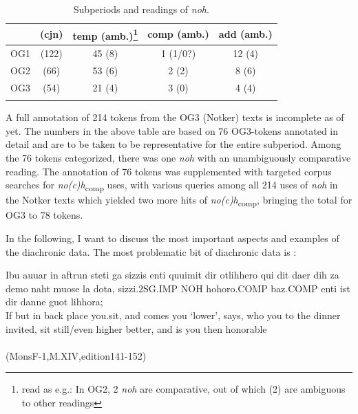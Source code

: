 \documentclass[output=paper,
modfonts
]{langscibook}
\begin{document}
\begin{table}[p]
\begin{tabular}{lcccc}
\lsptoprule
	& (cjn) & temp (amb.)\footnote{read as e.g.: In OG2, 2 \textit{noh} are comparative, out of which (2) are ambiguous to other readings}& comp (amb.)	& add (amb.)	\\
\midrule
OG1		& (122) & 45 (8)    & 1 (1/0?)  & 12 (4)    \\ 
OG2		& (66)  & 53 (6)    & 2 (2)     & 8 (6)     \\
OG3		& (54)  & 21 (4)    & 3 (0)     & 4 (4)     \\
\lspbottomrule
\end{tabular}
\caption{Subperiods and readings of \textit{noh}.}
\label{tab:subperiods_and_readings}
\end{table}

\noindent A full annotation of 214 tokens from the OG3 (Notker) texts is incomplete as of yet. The numbers in the above table are based on 76 OG3-tokens annotated in detail and are to be taken to be representative for the entire subperiod. Among the 76 tokens categorized, there was one \textit{noh} with an unambiguously comparative reading. The annotation of 76 tokens was supplemented with targeted corpus searches for \textit{no(c)h}\textsubscript{comp} uses, with various queries among all 214 uses of \textit{noh} in the Notker texts which yielded two more hits of \textit{no(c)h}\textsubscript{comp}, bringing the total for OG3 to 78 tokens.

In the following, I want to discuss the most important aspects and examples of the diachronic data. The most problematic bit of diachronic data is :

\ea\gll Ibu auuar in aftrun steti {ga sizzis} enti quuimit dir otlihhero {qui dit} daer dih za demo {naht muose} {la dota,} sizzi.2SG.IMP NOH hohoro.COMP baz.COMP enti ist dir danne {guot lihhora;}\\
       If but in back place you.sit, and comes you `lower', says, who you to the dinner invited, sit still/even higher better, and is you then honorable\\
 \label{OG1_comp?_00} \\(MonsF-1,M.XIV,edition141-152)
\z
\end{document}
